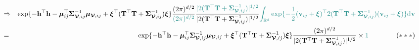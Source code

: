 \documentclass[12pt]{article}
\newcommand{\0}{\mathbf{0}}
\begin{document}
\begin{eqnarray*}
& \Rightarrow & \exp \{ - \mathbf{h}^{\top} \mathbf{h} - \boldsymbol{\mu}_{ij}^{\top} \boldsymbol{\Sigma}_{\boldsymbol{\mathcal{V}}, ij}^{-1} \boldsymbol{\mu}_{\boldsymbol{\mathcal{V}}, ij}  + \boldsymbol{\xi}^{\top} ( \mathbf{T}^{\top} \mathbf{T} + \boldsymbol{\Sigma}_{\boldsymbol{\mathcal{V}}, ij}^{-1} ) \boldsymbol{\xi} \} \frac{(2 \pi)^{d / 2}}{\textcolor{kaustgreen}{(2 \pi)^{d / 2}}} \frac{\textcolor{kaustgreen}{ | 2 ( \mathbf{T}^{\top} \mathbf{T} + \boldsymbol{\Sigma}_{\boldsymbol{\mathcal{V}}, ij}^{-1} ) |^{1/2} }}{| 2 ( \mathbf{T}^{\top} \mathbf{T} + \boldsymbol{\Sigma}_{\boldsymbol{\mathcal{V}}, ij}^{-1} ) |^{1/2}} \textcolor{kaustgreen}{ \int_{\mathbb{R}^d}  \exp \{- \frac{1}{2} ( \mathbf{v}_{ij} + \boldsymbol{\xi} )^{\top} 2 ( \mathbf{T}^{\top} \mathbf{T} + \boldsymbol{\Sigma}_{\boldsymbol{\mathcal{V}}, ij}^{-1} ) ( \mathbf{v}_{ij} + \boldsymbol{\xi} ) \} \dd \mathbf{v}} \\
& = & \exp \{ - \mathbf{h}^{\top} \mathbf{h} - \boldsymbol{\mu}_{ij}^{\top} \boldsymbol{\Sigma}_{\boldsymbol{\mathcal{V}}, ij}^{-1} \boldsymbol{\mu}_{\boldsymbol{\mathcal{V}}, ij}  + \boldsymbol{\xi}^{\top} ( \mathbf{T}^{\top} \mathbf{T} + \boldsymbol{\Sigma}_{\boldsymbol{\mathcal{V}}, ij}^{-1} ) \boldsymbol{\xi} \} \frac{ (2 \pi)^{d / 2} }{| 2 ( \mathbf{T}^{\top} \mathbf{T} + \boldsymbol{\Sigma}_{\boldsymbol{\mathcal{V}}, ij}^{-1} ) |^{1/2}} \times \textcolor{kaustgreen}{ 1 } \quad  \quad  \quad   \quad  (***)
\end{eqnarray*}
\end{document}
